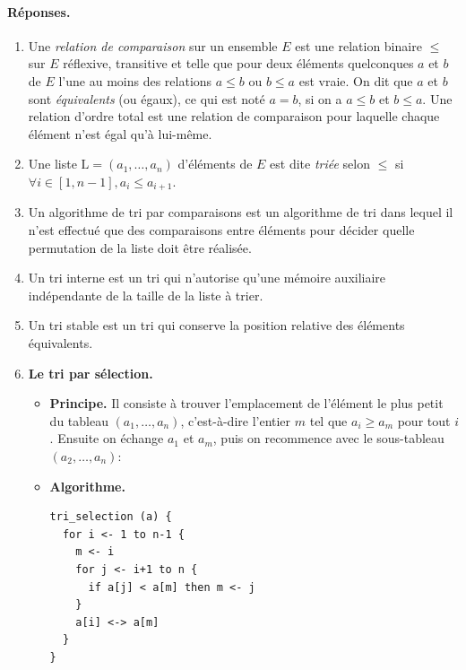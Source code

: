 \paragraph{Réponses.}

\begin{enumerate}

  \item Une \emph{relation de comparaison} sur un ensemble \(E\) est
    une relation binaire \(\leqslant\) sur \(E\) réflexive, transitive
    et telle que pour deux éléments quelconques \(a\) et \(b\) de
    \(E\) l'une au moins des relations \(a \leqslant b\) ou \(b
    \leqslant a\) est vraie. On dit que \(a\) et \(b\) sont
    \emph{équivalents} (ou égaux), ce qui est noté \(a = b\), si on a
    \(a \leqslant b\) et \(b \leqslant a\). Une relation d'ordre total
    est une relation de comparaison pour laquelle chaque élément n'est
    égal qu'à lui-même.

  \item Une liste \(\textrm{L} = (a_1, \ldots, a_n)\) d'éléments de
    \(E\) est dite \emph{triée} selon \(\leqslant\) si \(\forall i \in
    [1, n-1], a_i \leqslant a_{i+1}\).

  \item Un algorithme de tri par comparaisons est un algorithme de tri
    dans lequel il n'est effectué que des comparaisons entre éléments
    pour décider quelle permutation de la liste doit être réalisée.

  \item Un tri interne est un tri qui n'autorise qu'une mémoire
    auxiliaire indépendante de la taille de la liste à trier.

  \item Un tri stable est un tri qui conserve la position relative des
    éléments équivalents.

  \item \textbf{Le tri par sélection.}
    \begin{itemize}

        \item \textbf{Principe.} Il consiste à trouver l'emplacement
          de l'élément le plus petit du tableau \((a_1, \ldots,
          a_n)\), c'est-à-dire l'entier \(m\) tel que \(a_i \geqslant
          a_m\) pour tout \(i\). Ensuite on échange \(a_1\) et
          \(a_m\), puis on recommence avec le sous-tableau \((a_2,
          \ldots, a_n)\):

        \item \textbf{Algorithme.}
\begin{verbatim}
tri_selection (a) {
  for i <- 1 to n-1 {
    m <- i
    for j <- i+1 to n {
      if a[j] < a[m] then m <- j
    }
    a[i] <-> a[m]
  }
}
\end{verbatim} 


\end{itemize}
\end{enumerate}
